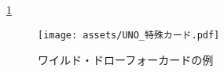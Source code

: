 \documentclass[11pt]{ltjsarticle}
\begin{document}
\ref{fig:ワイルド・ドローフォーカードの例}

\begin{figure}[h]
  \begin{center}
    \texttt{[image: assets/UNO\_特殊カード.pdf]}
    \caption{ワイルド・ドローフォーカードの例}
    \label{fig:ワイルド・ドローフォーカードの例}
  \end{center}
\end{figure}
\end{document}
